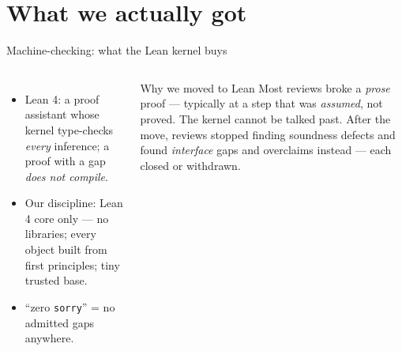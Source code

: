 \documentclass[aspectratio=169,11pt]{beamer}
\begin{document}
\section{What we actually got}
\begin{frame}{Machine-checking: what the Lean kernel buys}
\begin{columns}[T]
  \begin{itemize}
    \item \alert{Lean 4}: a proof assistant whose kernel type-checks
          \emph{every} inference; a proof with a gap \emph{does not compile}.
    \item Our discipline: Lean 4 \alert{core only} --- no libraries; every
          object built from first principles; tiny trusted base.
    \item ``\alert{zero \texttt{sorry}}'' = no admitted gaps anywhere.
  \end{itemize}
  \begin{block}{Why we moved to Lean}
    Most reviews broke a \emph{prose} proof --- typically at a
    step that was \emph{assumed}, not proved. The kernel cannot be talked
    past. After the move, reviews stopped finding soundness defects and
    found \emph{interface} gaps and overclaims instead --- each closed or
    withdrawn.
  \end{block}
\end{columns}
\end{frame}
\end{document}
